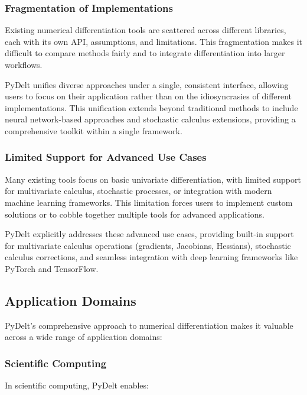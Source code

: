 \documentclass[11pt,a4paper]{article}
\begin{document}
\subsubsection{Fragmentation of Implementations}

Existing numerical differentiation tools are scattered across different libraries, each with its own API, assumptions, and limitations. This fragmentation makes it difficult to compare methods fairly and to integrate differentiation into larger workflows.

PyDelt unifies diverse approaches under a single, consistent interface, allowing users to focus on their application rather than on the idiosyncrasies of different implementations. This unification extends beyond traditional methods to include neural network-based approaches and stochastic calculus extensions, providing a comprehensive toolkit within a single framework.

\subsubsection{Limited Support for Advanced Use Cases}

Many existing tools focus on basic univariate differentiation, with limited support for multivariate calculus, stochastic processes, or integration with modern machine learning frameworks. This limitation forces users to implement custom solutions or to cobble together multiple tools for advanced applications.

PyDelt explicitly addresses these advanced use cases, providing built-in support for multivariate calculus operations (gradients, Jacobians, Hessians), stochastic calculus corrections, and seamless integration with deep learning frameworks like PyTorch and TensorFlow.

\subsection{Application Domains}

PyDelt's comprehensive approach to numerical differentiation makes it valuable across a wide range of application domains:

\subsubsection{Scientific Computing}

In scientific computing, PyDelt enables:
\end{document}
